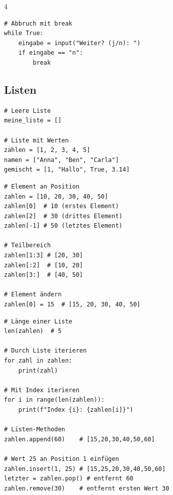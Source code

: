 \begin{landscape}
\begin{multicols*}{4}
\begin{cheatSheetBox}[title=while-Schleife]
\begin{lstlisting}
# Abbruch mit break
while True:
    eingabe = input("Weiter? (j/n): ")
    if eingabe == "n":
        break
\end{lstlisting}
		\end{cheatSheetBox}

		\columnbreak\textcolor{\cheatSheetColor}{\subsection*{Listen}}

		\begin{cheatSheetBox}[title=Listen erstellen]
			\begin{lstlisting}
# Leere Liste
meine_liste = []

# Liste mit Werten
zahlen = [1, 2, 3, 4, 5]
namen = ["Anna", "Ben", "Carla"]
gemischt = [1, "Hallo", True, 3.14]
\end{lstlisting}
		\end{cheatSheetBox}

		\begin{cheatSheetBox}[title=Auf Listen zugreifen]
			\begin{lstlisting}
# Element an Position
zahlen = [10, 20, 30, 40, 50]
zahlen[0]  # 10 (erstes Element)
zahlen[2]  # 30 (drittes Element)
zahlen[-1] # 50 (letztes Element)

# Teilbereich
zahlen[1:3] # [20, 30]
zahlen[:2]  # [10, 20]
zahlen[3:]  # [40, 50]

# Element ändern
zahlen[0] = 15  # [15, 20, 30, 40, 50]
\end{lstlisting}
		\end{cheatSheetBox}

		\begin{cheatSheetBox}[title=Listen verarbeiten]
			\begin{lstlisting}
# Länge einer Liste
len(zahlen)  # 5

# Durch Liste iterieren
for zahl in zahlen:
    print(zahl)

# Mit Index iterieren
for i in range(len(zahlen)):
    print(f"Index {i}: {zahlen[i]}")

# Listen-Methoden
zahlen.append(60)    # [15,20,30,40,50,60]

# Wert 25 an Position 1 einfügen
zahlen.insert(1, 25) # [15,25,20,30,40,50,60]
letzter = zahlen.pop() # entfernt 60
zahlen.remove(30)    # entfernt ersten Wert 30
\end{lstlisting}
		\end{cheatSheetBox}


\end{multicols*}
\end{landscape}
